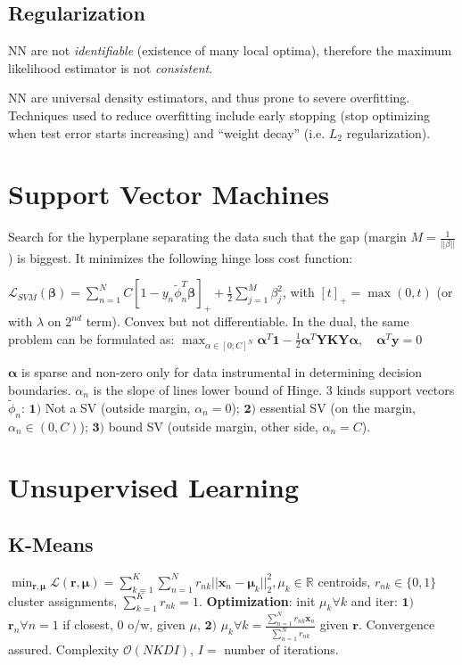 \documentclass[10pt,a4paper,landscape]{article}
\renewcommand{\bf}[1]{\ensuremath{\mathbf{#1}}}
\newcommand{\balpha}{\boldsymbol\alpha}
\newcommand{\bbeta}{\boldsymbol\beta}
\begin{document}
\begin{multicols*}{4}
\subsection{Regularization}
NN are not \textit{identifiable} (existence of many local optima), therefore the maximum likelihood estimator is not \textit{consistent}.

NN are universal density estimators, and thus prone to severe overfitting. Techniques used to reduce overfitting include early stopping (stop optimizing when test error starts increasing) and ``weight decay'' (i.e. $L_2$ regularization).

\section{Support Vector Machines}
Search for the hyperplane separating the data such that the gap (margin $M = \frac{1}{||\beta||}$) is biggest.
It minimizes the following hinge loss cost function:

$\mathcal{L}_{SVM} (\bbeta)= \sum_{n=1}^N C[1 - y_n \tilde\phi_n^T \bbeta]_{+} + \frac{1}{2} \sum_{j=1}^M \beta_j^2$, with $[t]_{+} = \max(0, t)$ (or with $\lambda$ on $2^{nd}$ term). 
Convex but not differentiable. In the dual, the same problem can be formulated as:
$\max_{\alpha \in [0; C]^N} \balpha^T \bf{1} - \frac{1}{2} \balpha^T \bf{Y K Y} \balpha , \quad \balpha^T \bf{y} = 0$

$\balpha$ is sparse and non-zero only for data instrumental in determining decision boundaries. $\alpha_n$ is the slope of lines lower bound of Hinge. 3 kinds support vectors $\tilde{\phi}_n$: $\bf{1)}$ Not a SV (outside margin, $\alpha_n = 0$); $\bf{2)}$ essential SV (on the margin, $\alpha_n \in (0,C)$); $\bf{3)}$ bound SV (outside margin, other side, $\alpha_n = C$).

\section{Unsupervised Learning}
\subsection{K-Means}
$\min_{\bf{r,\mu}} \mathcal{L}(\bf{r, \mu}) = 
\sum_{k=1}^K \sum_{n=1}^N r_{nk} ||\bf{x}_n - \bf{\mu}_k ||_2^2, \mu_k \in \mathbb{R}$ centroids, $r_{nk} \in \{0,1\}$  cluster assignments, $\sum_{k=1}^K r_{nk} = 1$.
\textbf{Optimization}: init $\mu_k \forall k$ and iter: $\bf{1)}$ $\bf{r}_n \forall n = 1$ if closest, $0$ o/w, given $\mu$, 
$\bf{2)}$ $\mu_k \forall k = 
\frac{\sum^N_{n=1} r_{nk} \bf{x}_n}{\sum^N_{n=1} r_{nk}}$
given $\bf{r}$.
Convergence assured. Complexity $\mathcal{O}(NKDI)$, $I =$ number of iterations.


\end{multicols*}
\end{document}
